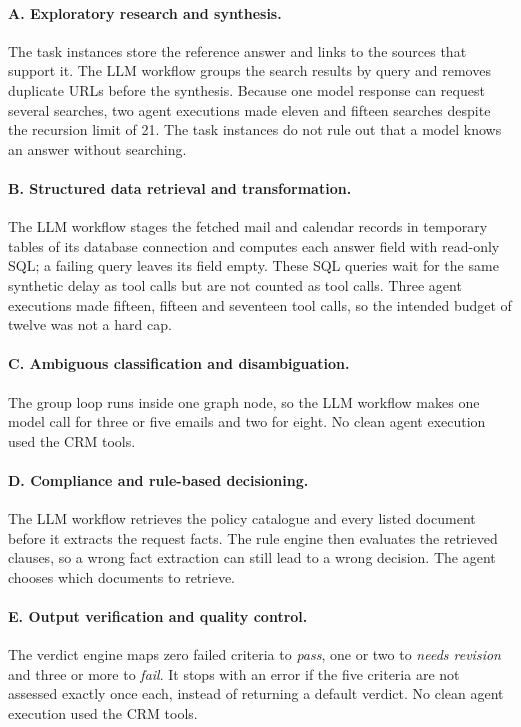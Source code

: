 \paragraph{A. Exploratory research and synthesis.}
\label{app:implementation/a}
The task instances store the reference answer and links to the sources that support it. The LLM workflow groups the search results by query and removes duplicate URLs before the synthesis. Because one model response can request several searches, two agent executions made eleven and fifteen searches despite the recursion limit of 21. The task instances do not rule out that a model knows an answer without searching.

\paragraph{B. Structured data retrieval and transformation.}
\label{app:implementation/b}
The LLM workflow stages the fetched mail and calendar records in temporary tables of its database connection and computes each answer field with read-only SQL; a failing query leaves its field empty. These SQL queries wait for the same synthetic delay as tool calls but are not counted as tool calls. Three agent executions made fifteen, fifteen and seventeen tool calls, so the intended budget of twelve was not a hard cap.

\paragraph{C. Ambiguous classification and disambiguation.}
\label{app:implementation/c}
The group loop runs inside one graph node, so the LLM workflow makes one model call for three or five emails and two for eight. No clean agent execution used the CRM tools.

\paragraph{D. Compliance and rule-based decisioning.}
\label{app:implementation/d}
The LLM workflow retrieves the policy catalogue and every listed document before it extracts the request facts. The rule engine then evaluates the retrieved clauses, so a wrong fact extraction can still lead to a wrong decision. The agent chooses which documents to retrieve.

\paragraph{E. Output verification and quality control.}
\label{app:implementation/e}
The verdict engine maps zero failed criteria to \textit{pass}, one or two to \textit{needs revision} and three or more to \textit{fail}. It stops with an error if the five criteria are not assessed exactly once each, instead of returning a default verdict. No clean agent execution used the CRM tools.

